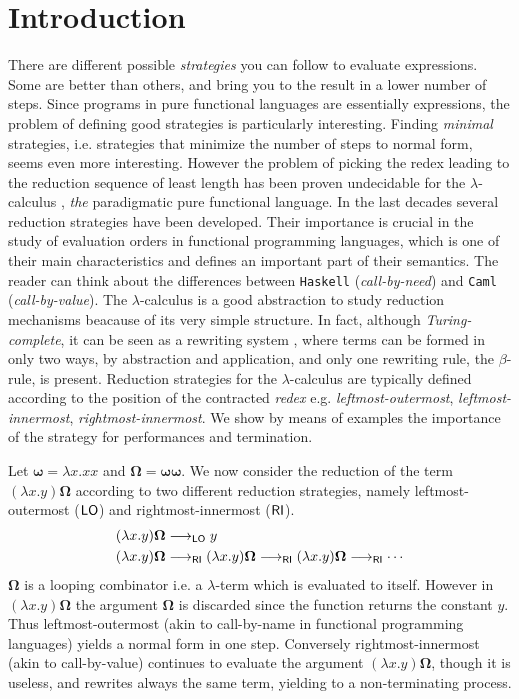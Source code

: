\chapter{Introduction}\label{ch:introduction}
There are different possible \emph{strategies} you can follow to evaluate expressions. Some are better than others, and bring you to the result in a lower number of steps. Since programs in pure functional languages are essentially expressions, the problem of defining good strategies is particularly interesting. Finding \emph{minimal} strategies, i.e. strategies that minimize the number of steps to normal form, seems even more interesting. However the problem of picking the redex leading to the reduction sequence of least length has been proven undecidable for the $\lambda$-calculus \cite[Section~13.5]{barendregt_lambda_1984}, \emph{the} paradigmatic pure functional language. In the last decades several reduction strategies have been developed. Their importance is crucial in the study of evaluation orders in functional programming languages, which is one of their main characteristics and defines an important part of their semantics. The reader can think about the differences between \texttt{Haskell} (\emph{call-by-need}) and \texttt{Caml} (\emph{call-by-value}). The $\lambda$-calculus is a good abstraction to study reduction mechanisms beacause of its very simple structure. In fact, although \emph{Turing-complete}, it can be seen as a rewriting system \cite{terese_term_2003}, where terms can be formed in only two ways, by abstraction and application, and only one rewriting rule, the $\beta$-rule, is present. Reduction strategies for the $\lambda$-calculus are typically defined according to the position of the contracted \emph{redex} e.g. \emph{leftmost-outermost}, \emph{leftmost-innermost}, \emph{rightmost-innermost}. We show by means of examples the importance of the strategy for performances and termination.
\begin{example}\label{example:canc}
	Let $\bm{\omega}=\lambda x.xx$ and $\bm{\Omega}=\bm{\omega\omega}$. We now consider the reduction of the term $(\lambda x.y)\bm{\Omega}$ according to two different reduction strategies, namely leftmost-outermost ($\mathsf{LO}$) and rightmost-innermost ($\mathsf{RI}$).
	\begin{align*}
	(\lambda x.y)\bm{\Omega}&\longrightarrow_{\mathsf{LO}} y\\
	(\lambda x.y)\bm{\Omega}&\longrightarrow_{\mathsf{RI}}(\lambda x.y)\bm{\Omega}\longrightarrow_{\mathsf{RI}}(\lambda x.y)\bm{\Omega}\longrightarrow_{\mathsf{RI}}\cdots
	\end{align*}
	$\bm{\Omega}$ is a looping combinator i.e. a $\lambda$-term which is evaluated to itself. However in $(\lambda x.y)\bm{\Omega}$ the argument $\bm{\Omega}$ is discarded since the function returns the constant $y$. Thus leftmost-outermost (akin to call-by-name in functional programming languages) yields a normal form in one step. Conversely rightmost-innermost (akin to call-by-value) continues to evaluate the argument $(\lambda x.y)\bm{\Omega}$, though it is useless, and rewrites always the same term, yielding to a non-terminating process.
\end{example}
